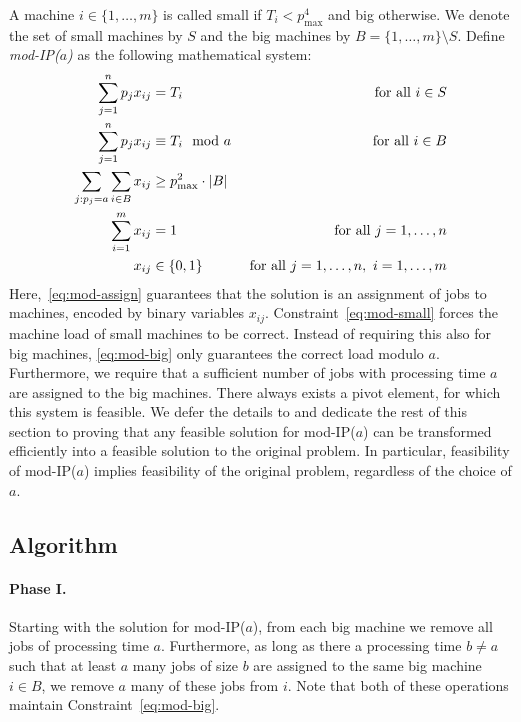\documentclass{article}
\newcommand{\mIP}{mod-IP($a$)}
\begin{document}
A machine $i \in \{1,\dotsc,m\}$ is called small if $T_i < p_{\max}^4$ and big otherwise. We denote the set of small machines
by $S$ and the big machines by $B = \{1,\dotsc,m\} \setminus S$.
Define \emph{\mIP} as the following mathematical system:
\begin{align}
	\sum_{j=1}^n p_j x_{ij} &= T_i &\text{ for all } i\in S \label{eq:mod-small} \\
	\sum_{j=1}^n p_j x_{ij} &\equiv T_i \mod a &\text{ for all } i\in B \label{eq:mod-big} \\
\sum_{j : p_j = a}\sum_{i\in B} x_{ij} &\ge p_{\max}^2 \cdot |B| & \label{eq:mod-pivot} \\
	\sum_{i=1}^m x_{ij} &= 1 &\text{ for all } j=1,\dotsc,n \label{eq:mod-assign} \\
	x_{ij} &\in \{0, 1\} &\text{ for all } j=1,\dotsc,n,\ i=1,\dotsc,m \notag
\end{align}
Here,~\eqref{eq:mod-assign} guarantees that the solution is an assignment of jobs to machines, encoded
by binary variables $x_{ij}$.
Constraint~\eqref{eq:mod-small} forces the machine load of small machines to be correct.
Instead of requiring this also for big machines, \eqref{eq:mod-big} only guarantees the correct
load modulo $a$.
Furthermore, we require that a sufficient number of jobs with processing time $a$ are assigned
to the big machines. There always exists a pivot element, for
which this system is feasible. We defer the details to  and dedicate the rest of this section to
proving that
any feasible solution for \mIP{} can be transformed efficiently into a feasible solution to the original problem.
In particular, feasibility of \mIP{} implies feasibility of the original problem,
regardless of the choice of $a$.

\subsection{Algorithm}\label{sec:main-alg}
\paragraph{Phase I.} Starting with the solution for \mIP{}, from each big machine we remove all jobs of processing time
$a$. Furthermore, as long as there a processing time $b\neq a$ such that at least $a$ many
jobs of size $b$ are assigned to the same big machine $i\in B$, we remove $a$ many of these jobs from $i$.
Note that both of these operations maintain Constraint~\eqref{eq:mod-big}.
\end{document}

